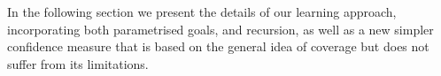 In the following section we present the details of our learning
approach, incorporating both parametrised goals, and recursion, as
well as a new simpler confidence measure that is based on the 
general idea of coverage but does not suffer from its limitations.







